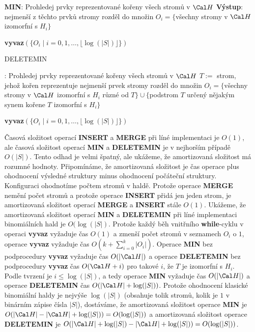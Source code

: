 \documentclass[a4paper,12pt]{article}
\begin{document}
{\bf MIN}:\newline 
Prohledej prvky reprezentované kořeny všech 
stromů  
v $\Cal H$\newline 
{\bf Výstup}: nejmenší z těchto prvků\newline 
stromy rozděl do množin $O_i=\{$všechny stromy v 
$\Cal H$ izomorfní s $H_i\}$\newline 
{\bf vyvaz$(\{O_i\mid i=0,1,\dots,\lfloor\log(|S|)\rfloor \})$

DELETEMIN}:\newline 
Prohledej prvky reprezentované kořeny všech 
stromů v $\Cal H$\newline 
$T:=$ strom, jehož kořen repre\-zentuje nejmenší 
prvek\newline 
stromy rozděl do množin $O_i=\{$všechny stromy v 
$\Cal H$ izomorfní s $H_i$ různé od $T\}\cup \{$podstrom $
T$ určený nějakým synem kořene $T$ 
izomorfní s $H_i\}$\newline 
{\bf vyvaz$(\{O_i\mid i=0,1,\dots,\lfloor\log(|S|)\rfloor \})$

}\v Casová složitost operací {\bf INSERT} a {\bf MER\-GE} při líné 
implementaci je $O(1)$, ale časová složitost operací {\bf MIN} a 
{\bf DELETEMIN} je v nejhorším případě $O(|S|)$. Tento odhad je 
velmi špatný, ale ukážeme, že amortizovaná složitost má rozumné 
hodnoty. 
Připomínáme, že amortizovaná složi\-tost je čas operace plus 
ohodnocení výsledné struktury minus ohodnocení 
počáteční struktury. 
Konfiguraci ohodnotíme počtem stromů v 
haldě. 
Protože ope\-race {\bf MERGE} nemění počet stromů a 
protože operace {\bf INSERT} přidá jen jeden strom, je 
amortizovaná složitost operací {\bf MERGE} a {\bf INSERT} stále $
O(1)$.
Ukážeme, že amortizovaná složitost operací {\bf MIN} a {\bf DELETEMIN }
při líné implementaci binomiálních hald je $O(\log
(|S|)$. 
Protože každý běh 
vnitřního {\bf while}-cyklu v operaci {\bf vyvaz} vyžaduje čas $
O(1)$ 
a zmenší počet stromů v seznamech $O_i$ o $1$, 
ope\-ra\-ce {\bf vyvaz} vyžaduje čas $O(k+\sum_{i=0}^k|O_i|
)$. Ope\-ra\-ce {\bf MIN}
bez podprocedury {\bf vyvaz} vyžaduje čas $O(|\Cal H|)$ a operace 
{\bf DELETEMIN} bez podprocedury {\bf vyvaz }čas $O(\Cal H+i)$ pro 
takové $i$, že $T$ je izomorfní s $H_i$. Podle tvrzení je $
i\le\log(|S|)$, a 
tedy ope\-ra\-ce {\bf MIN} vyžaduje čas $O(|\Cal H|)$ a ope\-race 
{\bf DELETEMIN }čas $O(|\Cal H|+\log(|S|))$. Protože  
ohodnocení klasické binomiální haldy je nejvýše $\log
(|S|)$ 
(obsahuje tolik stromů, kolik je $1$ v binárním zápise 
čísla $|S|$), dostáváme, že amortizovaná složitost ope\-race {\bf MIN} je 
$O(|\Cal H|-|\Cal H|+\log(|S|))=O(\log(|S|))$ a amortizovaná složitost 
operace {\bf DELETEMIN} je $O(|\Cal H|+\log(|S|)-|\Cal H|+\log(|S
|))=O(\log(|S|))$.
\end{document}
